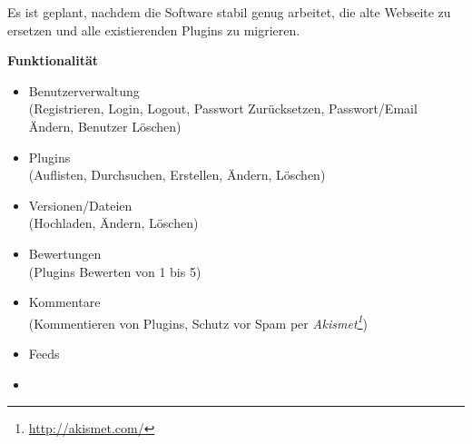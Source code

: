 \documentclass[pdftex,11pt,a4paper,notitlepage]{report}
\begin{document}
Es ist geplant,
nachdem die Software stabil genug arbeitet, die alte Webseite zu ersetzen und alle
existierenden Plugins zu migrieren.

\begin{flushleft}
\textbf{Funktionalität}
\end{flushleft}

\begin{itemize}
\item Benutzerverwaltung \\
(Registrieren, Login, Logout, Passwort Zurücksetzen, Passwort/Email Ändern, Benutzer Löschen)
\item Plugins \\
(Auflisten, Durchsuchen, Erstellen, Ändern, Löschen)
\item Versionen/Dateien \\
(Hochladen, Ändern, Löschen)
\item Bewertungen \\
(Plugins Bewerten von 1 bis 5)
\item Kommentare \\
(Kommentieren von Plugins, Schutz vor Spam per \textit{Akismet\footnote{\url{http://akismet.com/}}})
\item Feeds
\item 
\end{itemize}
\end{document}
